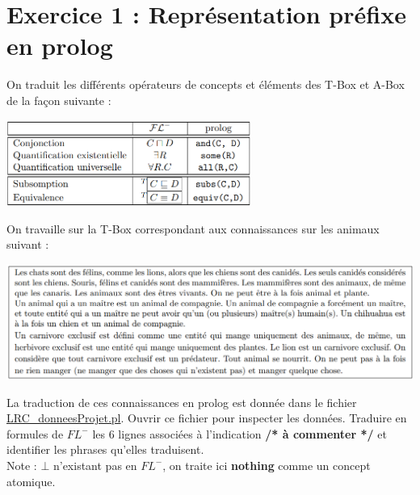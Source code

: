 \documentclass[a4paper,12pt]{report}
\begin{document}

\section*{Exercice 1 : Représentation préfixe en prolog}

On traduit les différents opérateurs de concepts et éléments des T-Box et A-Box de la façon suivante :
\begin{center}
    \includegraphics[width=0.6\textwidth]{./images/traduction_op.png}\\[1.5cm]
\end{center}

On travaille sur la T-Box correspondant aux connaissances sur les animaux suivant :
\begin{center}
    \includegraphics[width=1\textwidth]{./images/description_animaux.png}\\[1.5cm]
\end{center}

La traduction de ces connaissances en prolog est donnée dans le fichier \href{./src/LRC\_donneesProjet.pl}{LRC\_donneesProjet.pl}.
    Ouvrir ce fichier pour inspecter les données. Traduire en formules de \(FL^-\) les 6 lignes associées à l'indication \textbf{/* à commenter */} et
    identifier les phrases qu'elles traduisent.\\
    Note : \(\bot\) n'existant pas en \(FL^-\), on traite ici \textbf{nothing} comme un concept atomique.



\newpage
\end{document}
